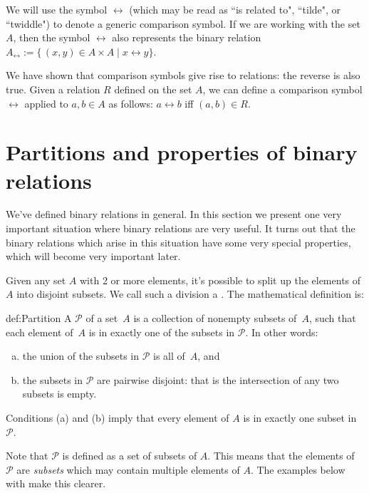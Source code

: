 We will use the symbol $\rel$ (which may be read as ``is related to", ``tilde", or ``twiddle") to denote a generic comparison symbol. If we are working with the set $A$, then the symbol $\rel$ also represents the binary relation $A_\rel := \{\, (x,y) \in A \times A \mid x \rel y \}$.

We have shown that comparison symbols give rise to relations: the reverse is also true. Given a relation $R$ defined on the set $A$, we can define a comparison symbol $\rel$ applied to $a,b \in A$ as follows:
$ a \rel b$ iff $(a,b) \in R$.

\section{Partitions and properties of binary relations  \quad{}} 
\label{sec:EquivalenceRelations:PartitionsAndProperties}

We've defined binary relations in general. In this section we present one very important situation where binary relations are very useful. It turns out that the binary relations which arise in this situation have some very special properties, which will become very important later.

Given any set $A$ with 2 or more elements, it's possible to split up the elements of $A$ into disjoint subsets. We call such a division a . The mathematical definition is:

\begin{defn}{def:Partition} A  $\mathcal{P}$ of a set~$A$ is a collection of nonempty subsets of~$A$, such that each element of~$A$ is in exactly one of the subsets in $\mathcal{P}$. In other words:
\begin{enumerate}[(a)]
\item the union of the subsets in $\mathcal{P}$ is all of~$A$,
and
\item the subsets in $\mathcal{P}$ are pairwise disjoint: that is the intersection of any two subsets is empty.
\end{enumerate}
Conditions (a) and (b) imply that every element of $A$ is in exactly one subset in $\mathcal{P}$.
\end{defn}

\begin{rem}
Note that $\mathcal{P}$ is defined as a set of subsets of $A$. This means that the elements of $\mathcal{P}$ are \emph{subsets} which may contain multiple elements of $A$. The examples below with make this clearer.
\end{rem}

